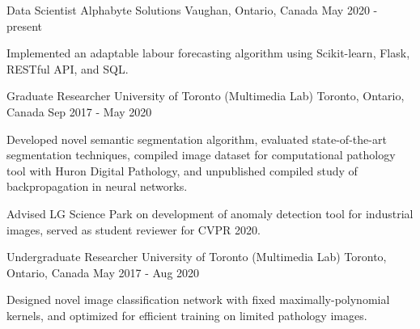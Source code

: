 

\begin{cventries}

  \cventry
    {Data Scientist} %
    {Alphabyte Solutions} %
    {Vaughan, Ontario, Canada} %
    {May 2020 - present} %
    {
      \begin{cvitems} %
        \item {Implemented an adaptable labour forecasting algorithm using Scikit-learn, Flask, RESTful API, and SQL.}
      \end{cvitems}
    }

  \cventry
    {Graduate Researcher} %
    {University of Toronto (Multimedia Lab)} %
    {Toronto, Ontario, Canada} %
    {Sep 2017 - May 2020} %
    {
      \begin{cvitems} %
        \item {Developed novel semantic segmentation algorithm, evaluated state-of-the-art segmentation techniques, compiled image dataset for computational pathology tool with Huron Digital Pathology, and unpublished compiled study of backpropagation in neural networks.}
        \item {Advised LG Science Park on development of anomaly detection tool for industrial images, served as student reviewer for CVPR 2020.}
      \end{cvitems}
    }

  \cventry
    {Undergraduate Researcher} %
    {University of Toronto (Multimedia Lab)} %
    {Toronto, Ontario, Canada} %
    {May 2017 - Aug 2020} %
    {
      \begin{cvitems} %
        \item {Designed novel image classification network with fixed maximally-polynomial kernels, and optimized for efficient training on limited pathology images.}
      \end{cvitems}
    }
		

\end{cventries}
